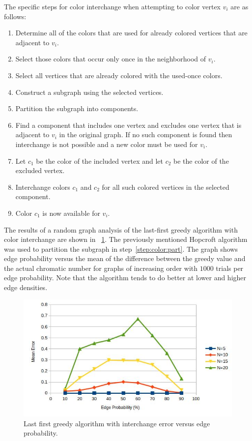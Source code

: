 The specific steps for color interchange when attempting to color vertex \(v_i\) are as follows:
\begin{enumerate}
\item Determine all of the colors that are used for already colored vertices that are adjacent to \(v_i\).
\item Select those colors that occur only once in the neighborhood of \(v_i\).
\item Select all vertices that are already colored with the used-once colors.
\item Construct a subgraph using the selected vertices.
\item\label{step:color:part} Partition the subgraph into components.
\item Find a component that includes one vertex and excludes one vertex that is adjacent to \(v_i\) in the original
  graph.  If no such component is found then interchange is not possible and a new color must be used for \(v_i\).
\item Let \(c_1\) be the color of the included vertex and let \(c_2\) be the color of the excluded vertex.
\item Interchange colors \(c_1\) and \(c_2\) for all such colored vertices in the selected component.
\item Color \(c_1\) is now available for \(v_i\).
\end{enumerate}

The results of a random graph analysis of the last-first greedy algorithm with color interchange are shown in
\figurename~\ref{fig:greedyerr}.  The previously mentioned Hopcroft algorithm~\cite{hopcroft} was used to partition
the subgraph in step~\ref{step:color:part}.  The graph shows edge probability versus the mean of the difference
between the greedy value and the actual chromatic number for graphs of increasing order with \(1000\) trials per
edge probability.  Note that the algorithm tends to do better at lower and higher edge densities.

\begin{figure}[H]
  \centering
  \includegraphics[width=5in]{greedy_error}
  \caption{Last first greedy algorithm with interchange error versus edge probability.}
  \label{fig:greedyerr}
\end{figure}

